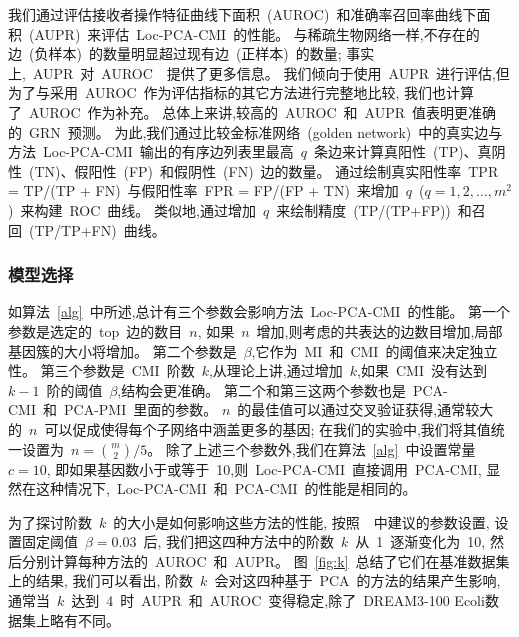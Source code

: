 我们通过评估接收者操作特征曲线下面积~(AUROC)~和准确率召回率曲线下面积~(AUPR)~来评估~Loc-PCA-CMI~的性能。
与稀疏生物网络一样,不存在的边~(负样本)~的数量明显超过现有边~(正样本)~的数量; 
事实上,~AUPR~对~AUROC~\cite{saito2015precision}~提供了更多信息。
我们倾向于使用~AUPR~进行评估,但为了与采用~AUROC~作为评估指标的其它方法进行完整地比较,
我们也计算了~AUROC~作为补充。
总体上来讲,较高的~AUROC~和~AUPR~值表明更准确的~GRN~预测。
为此,我们通过比较金标准网络~(golden network)~中的真实边与
方法~Loc-PCA-CMI~输出的有序边列表里最高~$q$~条边来计算真阳性~(TP)、真阴性~(TN)、假阳性~(FP)~和假阴性~(FN)~边的数量。
通过绘制真实阳性率~TPR = TP/(TP + FN)~与假阳性率~FPR = FP/(FP + TN)~来增加~$q$~($q = 1, 2, \ldots, m^2$)~来构建~ROC~曲线。
类似地,通过增加~$q$~来绘制精度~(TP/(TP+FP))~和召回~(TP/TP+FN)~曲线。


\subsubsection{模型选择}
如算法~\ref{alg}~中所述,总计有三个参数会影响方法~Loc-PCA-CMI~的性能。
第一个参数是选定的~top~边的数目~$n$,
如果~$n$~增加,则考虑的共表达的边数目增加,局部基因簇的大小将增加。
第二个参数是~$\beta$,它作为~MI~和~CMI~的阈值来决定独立性。
第三个参数是~CMI~阶数~$k$,从理论上讲,通过增加~$k$,如果~CMI~没有达到~$k-1$~阶的阈值~$\beta$,结构会更准确。
第二个和第三这两个参数也是~PCA-CMI~和~PCA-PMI~里面的参数。
$n$~的最佳值可以通过交叉验证获得,通常较大的~$n$~可以促成使得每个子网络中涵盖更多的基因;
在我们的实验中,我们将其值统一设置为~$n =\binom{m} {2}/5$。
除了上述三个参数外,我们在算法~\ref{alg}~中设置常量~$c = 10$,
即如果基因数小于或等于~10,则~Loc-PCA-CMI~直接调用~PCA-CMI,
显然在这种情况下,~Loc-PCA-CMI~和~PCA-CMI~的性能是相同的。


为了探讨阶数~$k$~的大小是如何影响这些方法的性能,
按照~\cite{zhang2011inferring,zhao2016part}~中建议的参数设置,
设置固定阈值~$\beta = 0.03$~后,
我们把这四种方法中的阶数~$k$~从~1~逐渐变化为~10,
然后分别计算每种方法的~AUROC~和~AUPR。
图~\ref{fig:k}~总结了它们在基准数据集上的结果, 我们可以看出, 阶数~$k$~会对这四种基于~PCA~的方法的结果产生影响,通常当~$k$~达到~4~时~AUPR~和~AUROC~变得稳定,除了~DREAM3-100 Ecoli数据集上略有不同。

